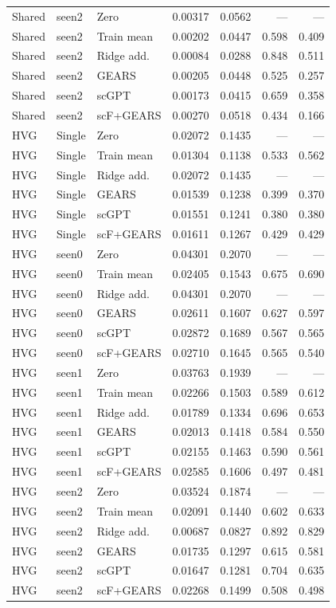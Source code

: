 {\begin{longtable}{lllrrrr}
Shared & seen2 & Zero & 0.00317 & 0.0562 & --- & ---\\
Shared & seen2 & Train mean & 0.00202 & 0.0447 & 0.598 & 0.409\\
Shared & seen2 & Ridge add. & 0.00084 & 0.0288 & 0.848 & 0.511\\
Shared & seen2 & GEARS & 0.00205 & 0.0448 & 0.525 & 0.257\\
Shared & seen2 & scGPT & 0.00173 & 0.0415 & 0.659 & 0.358\\
Shared & seen2 & scF+GEARS & 0.00270 & 0.0518 & 0.434 & 0.166\\
HVG & Single & Zero & 0.02072 & 0.1435 & --- & ---\\
HVG & Single & Train mean & 0.01304 & 0.1138 & 0.533 & 0.562\\
HVG & Single & Ridge add. & 0.02072 & 0.1435 & --- & ---\\
HVG & Single & GEARS & 0.01539 & 0.1238 & 0.399 & 0.370\\
HVG & Single & scGPT & 0.01551 & 0.1241 & 0.380 & 0.380\\
HVG & Single & scF+GEARS & 0.01611 & 0.1267 & 0.429 & 0.429\\
HVG & seen0 & Zero & 0.04301 & 0.2070 & --- & ---\\
HVG & seen0 & Train mean & 0.02405 & 0.1543 & 0.675 & 0.690\\
HVG & seen0 & Ridge add. & 0.04301 & 0.2070 & --- & ---\\
HVG & seen0 & GEARS & 0.02611 & 0.1607 & 0.627 & 0.597\\
HVG & seen0 & scGPT & 0.02872 & 0.1689 & 0.567 & 0.565\\
HVG & seen0 & scF+GEARS & 0.02710 & 0.1645 & 0.565 & 0.540\\
HVG & seen1 & Zero & 0.03763 & 0.1939 & --- & ---\\
HVG & seen1 & Train mean & 0.02266 & 0.1503 & 0.589 & 0.612\\
HVG & seen1 & Ridge add. & 0.01789 & 0.1334 & 0.696 & 0.653\\
HVG & seen1 & GEARS & 0.02013 & 0.1418 & 0.584 & 0.550\\
HVG & seen1 & scGPT & 0.02155 & 0.1463 & 0.590 & 0.561\\
HVG & seen1 & scF+GEARS & 0.02585 & 0.1606 & 0.497 & 0.481\\
HVG & seen2 & Zero & 0.03524 & 0.1874 & --- & ---\\
HVG & seen2 & Train mean & 0.02091 & 0.1440 & 0.602 & 0.633\\
HVG & seen2 & Ridge add. & 0.00687 & 0.0827 & 0.892 & 0.829\\
HVG & seen2 & GEARS & 0.01735 & 0.1297 & 0.615 & 0.581\\
HVG & seen2 & scGPT & 0.01647 & 0.1281 & 0.704 & 0.635\\
HVG & seen2 & scF+GEARS & 0.02268 & 0.1499 & 0.508 & 0.498\\
\bottomrule\end{longtable}}
